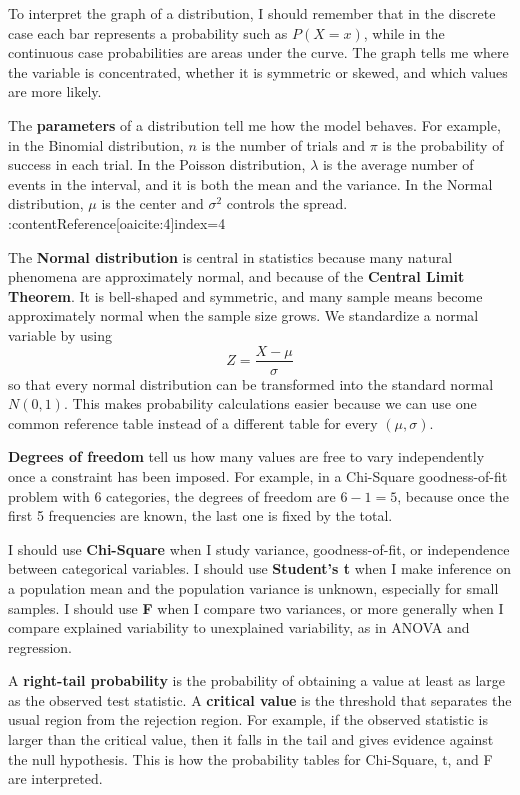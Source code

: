 \documentclass[11pt]{article}
\theoremstyle{smallexample}
\begin{document}
To interpret the graph of a distribution, I should remember that in the discrete case each bar represents a probability such as \(P(X=x)\), while in the continuous case probabilities are areas under the curve. The graph tells me where the variable is concentrated, whether it is symmetric or skewed, and which values are more likely.

The \textbf{parameters} of a distribution tell me how the model behaves. For example, in the Binomial distribution, \(n\) is the number of trials and \(\pi\) is the probability of success in each trial. In the Poisson distribution, \(\lambda\) is the average number of events in the interval, and it is both the mean and the variance. In the Normal distribution, \(\mu\) is the center and \(\sigma^2\) controls the spread. :contentReference[oaicite:4]{index=4}

The \textbf{Normal distribution} is central in statistics because many natural phenomena are approximately normal, and because of the \textbf{Central Limit Theorem}. It is bell-shaped and symmetric, and many sample means become approximately normal when the sample size grows. We standardize a normal variable by using
\[
Z=\frac{X-\mu}{\sigma}
\]
so that every normal distribution can be transformed into the standard normal \(N(0,1)\). This makes probability calculations easier because we can use one common reference table instead of a different table for every \((\mu,\sigma)\). 

\textbf{Degrees of freedom} tell us how many values are free to vary independently once a constraint has been imposed. For example, in a Chi-Square goodness-of-fit problem with 6 categories, the degrees of freedom are \(6-1=5\), because once the first 5 frequencies are known, the last one is fixed by the total. 

I should use \textbf{Chi-Square} when I study variance, goodness-of-fit, or independence between categorical variables. I should use \textbf{Student's t} when I make inference on a population mean and the population variance is unknown, especially for small samples. I should use \textbf{F} when I compare two variances, or more generally when I compare explained variability to unexplained variability, as in ANOVA and regression. 

A \textbf{right-tail probability} is the probability of obtaining a value at least as large as the observed test statistic. A \textbf{critical value} is the threshold that separates the usual region from the rejection region. For example, if the observed statistic is larger than the critical value, then it falls in the tail and gives evidence against the null hypothesis. This is how the probability tables for Chi-Square, t, and F are interpreted.
\end{document}
